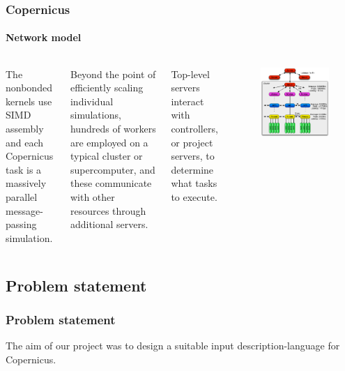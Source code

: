 \begin{frame}
\frametitle{Copernicus}
\framesubtitle{Network model}

\begin{columns}
   The nonbonded kernels use SIMD assembly and
  each Copernicus task is a massively parallel message-passing
  simulation.
  \vspace{10pt}

  \pause Beyond the point of efficiently scaling individual
  simulations, hundreds of workers are employed on a typical cluster
  or supercomputer, and these communicate with other resources through
  additional servers.
  \vspace{10pt}

  \pause Top-level servers interact with controllers, or project
  servers, to determine what tasks to execute.

  \begin{figure}
    \centering
    \includegraphics[width=\textwidth]{gfx/parallelization.pdf}
  \end{figure}
\end{columns}

\end{frame}


\subsection*{Problem statement}
\begin{frame}
\frametitle{Problem statement}

The aim of our project was to design a suitable input
description-language for Copernicus.

\end{frame}
